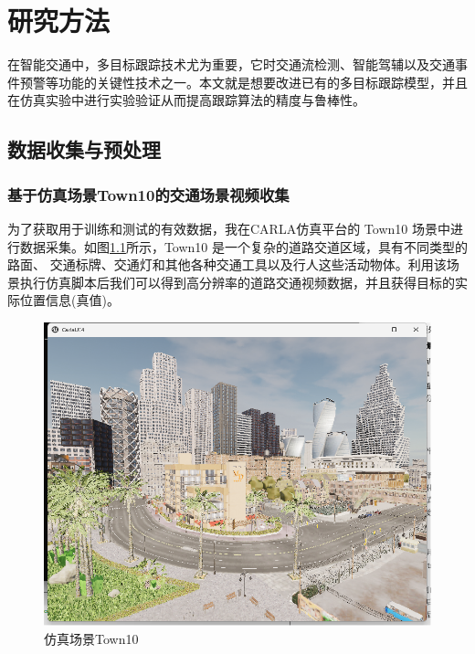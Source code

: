 \chapter{研究方法}


在智能交通中，多目标跟踪技术尤为重要，它时交通流检测、智能驾辅以及交通事件预警等功能的关键性技术之一。本文就是想要改进已有的多目标跟踪模型，并且在仿真实验中进行实验验证从而提高跟踪算法的精度与鲁棒性。


\section{数据收集与预处理}



\subsection{基于仿真场景Town10的交通场景视频收集}





为了获取用于训练和测试的有效数据，我在CARLA仿真平台的 Town10 场景中进行数据采集。如图\ref{fig:p5}所示，Town10 是一个复杂的道路交道区域，具有不同类型的路面、 交通标牌、交通灯和其他各种交通工具以及行人这些活动物体。利用该场景执行仿真脚本后我们可以得到高分辨率的道路交通视频数据，并且获得目标的实际位置信息(真值)。


\begin{figure}[htbp] %
	\centering
	\includegraphics[width=1\textwidth]{p5} %
	\caption{仿真场景Town10} %
	\label{fig:p5} %
\end{figure}






